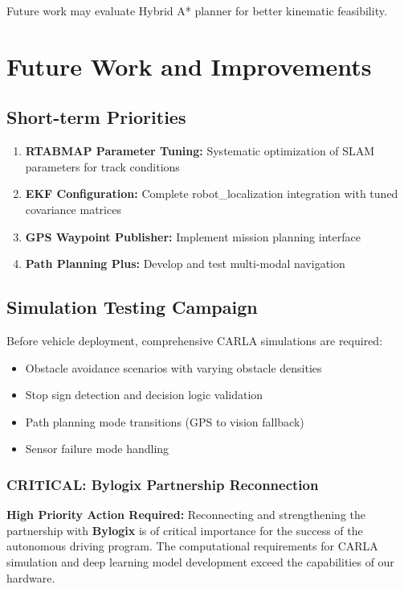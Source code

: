 Future work may evaluate Hybrid A* planner for better kinematic feasibility.

\section{Future Work and Improvements}

\subsection{Short-term Priorities}
\begin{enumerate}
    \item \textbf{RTABMAP Parameter Tuning:} Systematic optimization of SLAM parameters for track conditions
    \item \textbf{EKF Configuration:} Complete robot\_localization integration with tuned covariance matrices
    \item \textbf{GPS Waypoint Publisher:} Implement mission planning interface
    \item \textbf{Path Planning Plus:} Develop and test multi-modal navigation
\end{enumerate}

\subsection{Simulation Testing Campaign}
Before vehicle deployment, comprehensive CARLA simulations are required:
\begin{itemize}
    \item Obstacle avoidance scenarios with varying obstacle densities
    \item Stop sign detection and decision logic validation
    \item Path planning mode transitions (GPS to vision fallback)
    \item Sensor failure mode handling
\end{itemize}

\subsubsection{\textbf{CRITICAL: Bylogix Partnership Reconnection}}
\textbf{High Priority Action Required:} Reconnecting and strengthening the partnership with \textbf{Bylogix} is of critical importance for the success of the autonomous driving program. The computational requirements for CARLA simulation and deep learning model development exceed the capabilities of our hardware.

